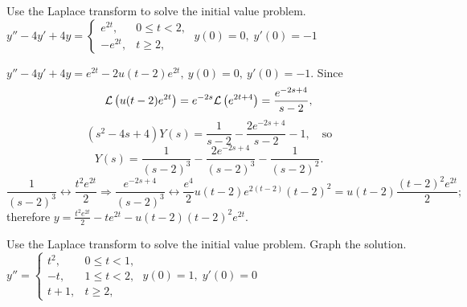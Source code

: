 \documentclass{ximera}
\begin{document}
\begin{problem}\label{exer:8.5.18} Use the Laplace transform to solve the initial value problem.
$y''-4y'+4y=\left\{\begin{array}{rl}
e^{2t},&0\le t<2,\\-e^{2t},&t\ge 2,\end{array}\right.\;  y(0)=0,\;
y'(0)=-1$

\begin{solution}
$y''-4y'+4y=e^{2t}-2u(t-2)e^{2t},\ y(0)=0,\ y'(0)=-1$.
Since
$$
{\cal L}\left(u(t-2)e^{2t}\right)=e^{-2s}{\cal
L}\left(e^{2t+4}\right)=\frac{e^{-2s+4}}{s-2},
$$
$$
(s^2-4s+4)Y(s)=\frac{1}{s-2}-\frac{2e^{-2s+4}}{s-2}-1,\quad\mbox{so}
$$
$$
Y(s)=\frac{1}{(s-2)^3}-\frac{2e^{-2s+4}}{(s-2)^3}-\frac{1}{(s-2)^2}.
$$
$$
\frac{1}{(s-2)^3}\leftrightarrow \frac{t^2e^{2t}}{2}\Rightarrow
\frac{e^{-2s+4}}{(s-2)^3}\leftrightarrow\frac{e^4}{2}u(t-2)e^{2(t-2)}(t-2)^2
=u(t-2)\frac{(t-2)^2e^{2t}}{2};
$$
therefore
$y=\frac{t^2e^{2t}}{2}-te^{2t}-u(t-2)(t-2)^2e^{2t}$.
\end{solution}
\end{problem}

\begin{problem}\label{exer:8.5.19} Use the Laplace transform to solve the initial value problem.  Graph the solution. 
$y''=\left\{\begin{array}{cl}t^2,&0\le
t<1,\\-t,&1\le t<2,\\t+1,&t\ge 2,\end{array}\right.\;  y(0)=1,\;
y'(0)=0$
\end{problem}
\end{document}
